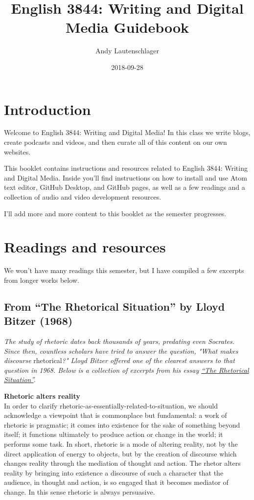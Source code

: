 \documentclass[]{book}
\title{English 3844: Writing and Digital Media Guidebook}
\author{Andy Lautenschlager}
\date{2018-09-28}
\theoremstyle{definition}
\theoremstyle{definition}
\theoremstyle{definition}
\theoremstyle{remark}
\begin{document}
\maketitle

{
\setcounter{tocdepth}{1}
\tableofcontents
}
\hypertarget{introduction}{%
\chapter{Introduction}\label{introduction}}

Welcome to English 3844: Writing and Digital Media! In this class we
write blogs, create podcasts and videos, and then curate all of this
content on our own websites.

This booklet contains instructions and resources related to English
3844: Writing and Digital Media. Inside you'll find instructions on how
to install and use Atom text editor, GitHub Desktop, and GitHub pages,
as well as a few readings and a collection of audio and video
development resources.

I'll add more and more content to this booklet as the semester
progresses.

\hypertarget{readings}{%
\chapter{Readings and resources}\label{readings}}

We won't have many readings this semester, but I have compiled a few
excerpts from longer works below.

\hypertarget{from-the-rhetorical-situation-by-lloyd-bitzer-1968}{%
\section{From ``The Rhetorical Situation'' by Lloyd Bitzer
(1968)}\label{from-the-rhetorical-situation-by-lloyd-bitzer-1968}}

\emph{The study of rhetoric dates back thousands of years, predating
even Socrates. Since then, countless scholars have tried to answer the
question, "What makes discourse} rhetorical\emph{?" Lloyd Bitzer offered
one of the clearest answers to that question in 1968. Below is a
collection of excerpts from his essay
\href{http://www.arts.uwaterloo.ca/~raha/309CWeb/Bitzer(1968).pdf}{``The
Rhetorical Situation''}.}

\textbf{Rhetoric alters reality}\\
In order to clarify rhetoric-as-essentially-related-to-situation, we
should acknowledge a viewpoint that is commonplace but fundamental: a
work of rhetoric is pragmatic; it comes into existence for the sake of
something beyond itself; it functions ultimately to produce action or
change in the world; it performs some task. In short, rhetoric is a mode
of altering reality, not by the direct application of energy to objects,
but by the creation of discourse which changes reality through the
mediation of thought and action. The rhetor alters reality by bringing
into existence a discourse of such a character that the audience, in
thought and action, is so engaged that it becomes mediator of change. In
this sense rhetoric is always persuasive.
\end{document}
